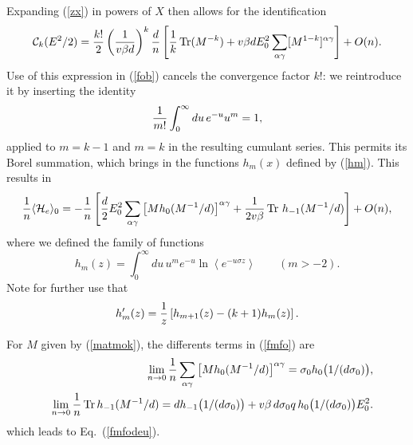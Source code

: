 Expanding (\ref{zx}) in powers of $X$ then allows for the identification
\begin{equation}
{\cal C}_k(E^2/2)={k!\over 2}\left({1\over v\beta d}\right)^k \frac{d}{n}\left[{1\over k}\mathop{\text{Tr}} (M^{-k})+{v\beta d} E_0^2 \sum_{\alpha\gamma} [M^{1-k}]^{\alpha\gamma}\right]+O(n).
\end{equation}
Use of this expression in (\ref{fob}) cancels the convergence factor
$k!$: we reintroduce it by inserting the identity
\begin{equation}
{1\over m!}\int_0^\infty du\, e^{-u} u^m =1,
\end{equation}
applied to $m=k-1$ and $m=k$ in the resulting cumulant series. This
permits its Borel summation, which brings in the functions $h_m(x)$
defined by (\ref{hm}). This results in 
\begin{equation}
\label{fmfo}
{1\over n}
\langle{\cal H}_e\rangle_0
=-{1\over n}
\left[ 
{d\over 2}E_0^2
\sum_{\alpha\gamma}\left[ M
h_0(M^{-1}/d)\right]^{\alpha\gamma}
+{1\over 2 v \beta}\mathop{\text{Tr}}\, h_{-1}(M^{-1}/d)
\right]+O(n),
\end{equation}
where we defined the family of functions
\begin{equation}
\label{hm}
h_m(z)=\int_0^\infty du\,u^m e^{-u} \ln\left\langle e^{-u\sigma
z}\right\rangle\qquad(m>-2).
\end{equation}
Note for further use that
\begin{equation}
\label{deriv}
h_m'(z)={1\over z}\left[h_{m+1}(z)-(k+1)h_{m}(z)\right].
\end{equation}

For $M$ given by (\ref{matmok}), the differents terms in (\ref{fmfo}) are
\begin{eqnarray}
&&\lim_{n\to 0}{1\over n} \sum_{\alpha\gamma} \left[M
h_0(M^{-1}/d)\right]^{\alpha\gamma}=\sigma_0 h_0
\bigl(1/(d\sigma_0)\bigr),
\nonumber\\ 
&&\lim_{n\to 0}{1\over n}\mathop{\text{Tr}}
h_{-1}(M^{-1}/d)=dh_{-1}\bigl(1/(d\sigma_0)\bigr)+v\beta\, d\sigma_0 q\, h_0 \bigl(1/(d\sigma_0)\bigr)E_0^2.
\end{eqnarray}
which leads to Eq.\ (\ref{fmfodeu}).

